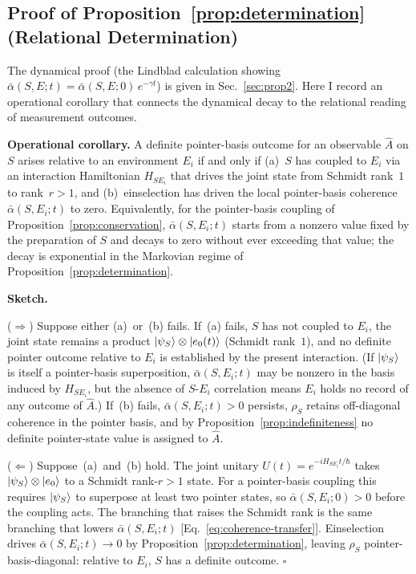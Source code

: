 \subsection{Proof of Proposition~\ref{prop:determination} (Relational Determination)}

The dynamical proof (the Lindblad calculation showing
$\bar\alpha(S,E;t) = \bar\alpha(S,E;0)\,e^{-\gamma t}$) is given in
Sec.~\ref{sec:prop2}.
Here I record an operational corollary that connects the dynamical
decay to the relational reading of measurement outcomes.

\textbf{Operational corollary.}
A definite pointer-basis outcome for an observable $\hat{A}$ on $S$
arises relative to an environment $E_i$ if and only if (a)~$S$ has
coupled to $E_i$ via an interaction Hamiltonian $H_{SE_i}$ that drives
the joint state from Schmidt rank~$1$ to rank~$r > 1$, and
(b)~einselection has driven the local pointer-basis
coherence $\bar\alpha(S,E_i;t)$ to zero.
Equivalently, for the pointer-basis coupling of
Proposition~\ref{prop:conservation}, $\bar\alpha(S,E_i;t)$ starts from
a nonzero value fixed by the preparation of $S$ and decays to zero
without ever exceeding that value; the decay is exponential in the
Markovian regime of Proposition~\ref{prop:determination}.

\textbf{Sketch.}

($\Rightarrow$)
Suppose either (a)~or~(b) fails.
If~(a) fails, $S$ has not coupled to $E_i$, the joint state remains a
product $\ket{\psi_S}\otimes\ket{e_0(t)}$ (Schmidt rank~$1$), and no
definite pointer outcome relative to $E_i$ is established by the
present interaction.
(If $\ket{\psi_S}$ is itself a pointer-basis superposition,
$\bar\alpha(S,E_i;t)$ may be nonzero in the basis induced by
$H_{SE_i}$, but the absence of $S$-$E_i$ correlation means $E_i$ holds
no record of any outcome of $\hat{A}$.)
If~(b) fails, $\bar\alpha(S,E_i;t) > 0$ persists, $\rho_S$ retains
off-diagonal coherence in the pointer basis, and by
Proposition~\ref{prop:indefiniteness} no definite pointer-state value
is assigned to $\hat{A}$.

($\Leftarrow$)
Suppose~(a)~and~(b) hold.
The joint unitary $U(t) = e^{-iH_{SE_i}t/\hbar}$ takes
$\ket{\psi_S}\otimes\ket{e_0}$ to a Schmidt rank-$r>1$ state.
For a pointer-basis coupling this requires $\ket{\psi_S}$ to superpose
at least two pointer states, so $\bar\alpha(S,E_i;0) > 0$ before the
coupling acts.
The branching that raises the Schmidt rank is the same branching that
lowers $\bar\alpha(S,E_i;t)$ [Eq.~\eqref{eq:coherence-transfer}].
Einselection~\cite{Zurek2003} drives
$\bar\alpha(S,E_i;t)\to 0$ by Proposition~\ref{prop:determination},
leaving $\rho_S$ pointer-basis-diagonal: relative to $E_i$, $S$ has a
definite outcome. $\square$

